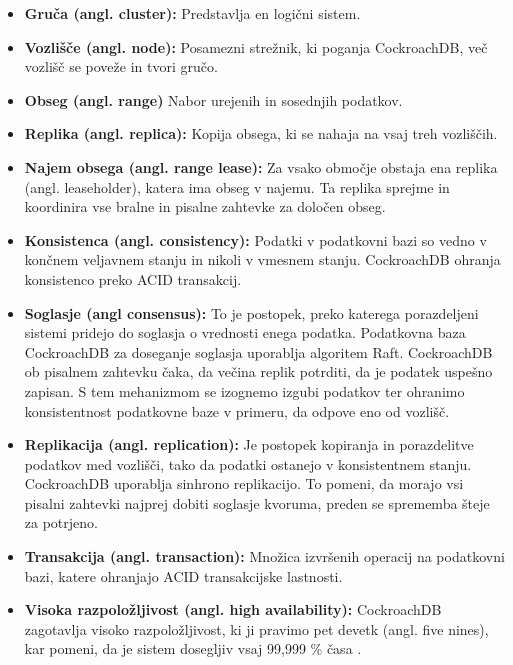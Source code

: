 \documentclass[a4paper, 12pt]{book}
\begin{document}
\begin{itemize}
    \item \textbf{Gruča (angl. cluster):} Predstavlja en logični sistem. 
    \item \textbf{Vozlišče (angl. node):} Posamezni strežnik, ki poganja Cock\-roach\-DB, več vozlišč se poveže in tvori gručo.
    \item \textbf{Obseg (angl. range)} Nabor urejenih in sosednjih podatkov.
    \item \textbf{Replika (angl. replica):} Kopija obsega, ki se nahaja na vsaj treh vozliščih.
    \item \textbf{Najem obsega (angl. range lease):} Za vsako območje obstaja ena replika (angl. leaseholder), katera ima obseg v najemu. Ta replika sprejme in koordinira vse bralne in pisalne zahtevke za določen obseg.
    \item \textbf{Konsistenca (angl. consistency):} Podatki v podatkovni bazi so vedno v končnem veljavnem stanju in nikoli v vmesnem stanju. Cock\-roach\-DB ohranja konsistenco preko ACID transakcij.
    \item \textbf{Soglasje (angl consensus):} To je postopek, preko katerega porazdeljeni sistemi pridejo do soglasja o vrednosti enega podatka. Podatkovna baza CockroachDB za doseganje soglasja uporablja algoritem Raft. Cock\-roach\-DB ob pisalnem zahtevku čaka, da večina replik potrditi, da je podatek uspešno zapisan. S tem mehanizmom se izognemo izgubi podatkov ter ohranimo konsistentnost podatkovne baze v primeru, da odpove eno od vozlišč.
    \item \textbf{Replikacija (angl. replication):} Je postopek kopiranja in porazdelitve podatkov med vozlišči, tako da podatki ostanejo v konsistentnem stanju. Cock\-roach\-DB uporablja sinhrono replikacijo. To pomeni, da morajo vsi pisalni zahtevki najprej dobiti soglasje kvoruma, preden se sprememba šteje za potrjeno.
    \item \textbf{Transakcija (angl. transaction):} Množica izvršenih operacij na podatkovni bazi, katere ohranjajo ACID transakcijske lastnosti.
    \item \textbf{Visoka razpoložljivost (angl. high availability):} CockroachDB zagotavlja visoko razpoložljivost, ki ji pravimo pet devetk (angl. five nines), kar pomeni, da je sistem dosegljiv vsaj 99,999 \% časa \cite{CRDB-FAQ}.
\end{itemize}
\end{document}
